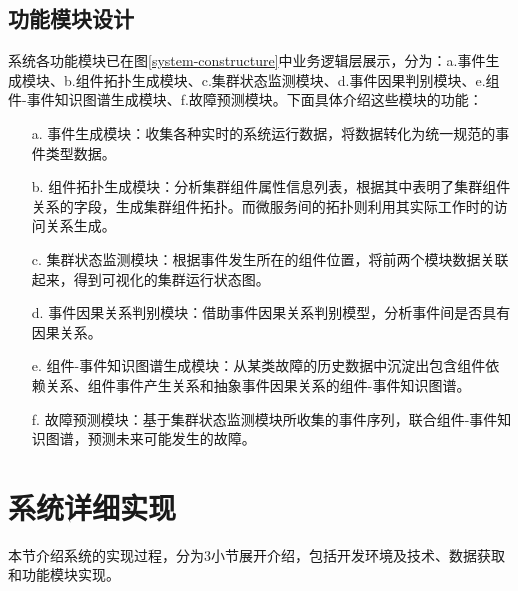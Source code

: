 \subsection{功能模块设计}\label{system-function}
系统各功能模块已在图\ref{system-constructure}中业务逻辑层展示，分为：a.事件生成模块、b.组件拓扑生成模块、c.集群状态监测模块、d.事件因果判别模块、e.组件-事件知识图谱生成模块、f.故障预测模块。下面具体介绍这些模块的功能：
\begin{itemize}
    \item [a.]事件生成模块：收集各种实时的系统运行数据，将数据转化为统一规范的事件类型数据。
    \item [b.]组件拓扑生成模块：分析集群组件属性信息列表，根据其中表明了集群组件关系的字段，生成集群组件拓扑。而微服务间的拓扑则利用其实际工作时的访问关系生成。
    \item [c.]集群状态监测模块：根据事件发生所在的组件位置，将前两个模块数据关联起来，得到可视化的集群运行状态图。
    \item [d.]事件因果关系判别模块：借助事件因果关系判别模型，分析事件间是否具有因果关系。
    \item [e.]组件-事件知识图谱生成模块：从某类故障的历史数据中沉淀出包含组件依赖关系、组件事件产生关系和抽象事件因果关系的组件-事件知识图谱。
    \item [f.]故障预测模块：基于集群状态监测模块所收集的事件序列，联合组件-事件知识图谱，预测未来可能发生的故障。
\end{itemize}

\section{系统详细实现}
本节介绍系统的实现过程，分为3小节展开介绍，包括开发环境及技术、数据获取和功能模块实现。

